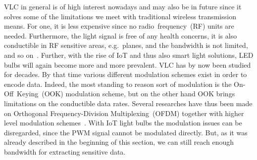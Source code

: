 VLC in general is of high interest nowadays and may also be in future since it solves some of the limitations we meet with traditional wireless transmission means. For one, it is less expensive since no radio~frequency~(RF) units are needed. Furthermore, the light signal is free of any health concerns, it is also conductible in RF sensitive areas, e.g.\ planes, and the bandwidth is not limited, and so on~\cite{Elgala:2007:OVLWCBoWL}. Further, with the rise of IoT and thus also smart light solutions, LED bulbs will again become more and more prevalent.
VLC has by now been studied for decades. By that time various different modulation schemes exist in order to encode data. Indeed, the most standing to reason sort of modulation is the On-Off~Keying~(OOK) modulation scheme, but on the other hand OOK brings limitations on the conductible data rates. Several researches have thus been made on Orthogonal Frequency-Division Multiplexing~(OFDM) together with higher level modulation schemes~\cite{Elgala:2007:OVLWCBoWL,Yu:2014:BCDRCVLOS}. With IoT light bulbs the modulation issues can be disregarded, since the PWM signal cannot be modulated directly. But, as it was already described in the beginning of this section, we can still reach enough bandwidth for extracting sensitive data.
